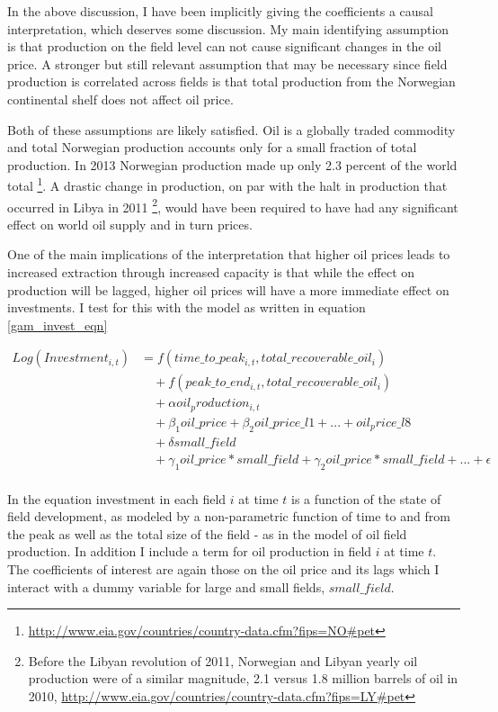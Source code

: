 \documentclass[12pt]{article}
\begin{document}
In the above discussion, I have been implicitly giving the coefficients a causal interpretation, which deserves some discussion.  My main identifying assumption is that production on the field level can not cause significant changes in the oil price.  A stronger but still relevant assumption that may be necessary since field production is correlated across fields is that total production from the Norwegian continental shelf does not affect oil price.  

Both of these assumptions are likely satisfied.  Oil is a globally traded commodity and total Norwegian production accounts only for a small fraction of total production.  In 2013 Norwegian production made up only 2.3 percent of the world total \footnote{\url{http://www.eia.gov/countries/country-data.cfm?fips=NO#pet}}.  A drastic change in production, on par with the halt in production that occurred in Libya in 2011 \footnote{Before the Libyan revolution of 2011, Norwegian and Libyan yearly oil production were of a similar magnitude, 2.1 versus 1.8 million barrels of oil in 2010, \url{http://www.eia.gov/countries/country-data.cfm?fips=LY#pet}}, would have been required to have had any significant effect on world oil supply and in turn prices. 

One of the main implications of the interpretation that higher oil prices leads to increased extraction through increased capacity is that while the effect on production will be lagged, higher oil prices will have a more immediate effect on investments.  I test for this with the model as written in equation \ref{gam_invest_eqn}

\begin{equation}
\begin{split}
	Log(Investment_{i,t})&=f(time\_to\_peak_{i,t}, total\_recoverable\_oil_i) \\
	& \quad + f(peak\_to\_end_{i,t}, total\_recoverable\_oil_i) \\
& \quad + \alpha oil_production_{i,t} \\
	& \quad + \beta_1 oil\_price + \beta_2 oil\_price\_l1 + ... + oil_price\_l8 \\
	& \quad + \delta small\_field \\
	& \quad + \gamma_1 oil\_price*small\_field + \gamma_2 oil\_price*small\_field + ... 
	+  \epsilon \\
\end{split}
\label{gam_invest_eqn}
\end{equation}

In the equation investment in each field $i$ at time $t$ is a function of the state of field development, as modeled by a non-parametric function of time to and from the peak as well as the total size of the field - as in the model of oil field production.  In addition I include a term for oil production in field $i$ at time $t$.  The coefficients of interest are again those on the oil price and its lags which I interact with a dummy variable for large and small fields, $small\_field$.  
\end{document}
